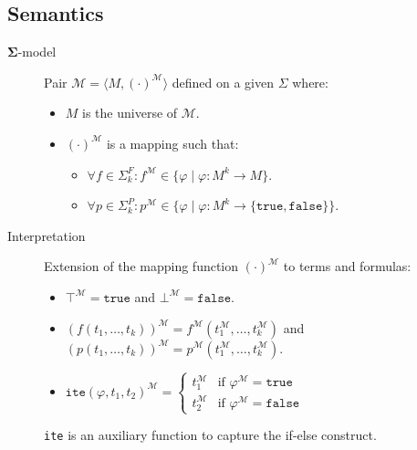 \subsection{Semantics}

\begin{description}
    \item[$\mathbf{\Sigma}$-model] 
        Pair $\mathcal{M} = \langle M, (\cdot)^\mathcal{M} \rangle$ defined on a given $\Sigma$ where:
        \begin{itemize}
            \item $M$ is the universe of $\mathcal{M}$.
            \item $(\cdot)^\mathcal{M}$ is a mapping such that:
            \begin{itemize}
                \item $\forall f \in \Sigma^F_k: f^\mathcal{M} \in \{ \varphi \mid \varphi: M^k \rightarrow M \}$.
                \item $\forall p \in \Sigma^P_k: p^\mathcal{M} \in \{ \varphi \mid \varphi: M^k \rightarrow \{ \texttt{true}, \texttt{false} \} \}$.
            \end{itemize}
        \end{itemize} 

    \item[Interpretation] 
        Extension of the mapping function $(\cdot)^\mathcal{M}$ to terms and formulas:
        \begin{itemize}
            \item $\top^\mathcal{M} = \texttt{true}$ and $\bot^\mathcal{M} = \texttt{false}$.
            \item $(f(t_1, \dots, t_k))^\mathcal{M} = f^\mathcal{M}(t_1^\mathcal{M}, \dots, t_k^\mathcal{M})$ and 
                $(p(t_1, \dots, t_k))^\mathcal{M} = p^\mathcal{M}(t_1^\mathcal{M}, \dots, t_k^\mathcal{M})$.
            \item $\texttt{ite}(\varphi, t_1, t_2)^\mathcal{M} = \begin{cases}
                t_1^\mathcal{M} & \text{if $\varphi^\mathcal{M} = \texttt{true}$} \\
                t_2^\mathcal{M} & \text{if $\varphi^\mathcal{M} = \texttt{false}$}
            \end{cases}$
        \end{itemize}

        \begin{remark}
            \texttt{ite} is an auxiliary function to capture the if-else construct.
        \end{remark}
\end{description}


